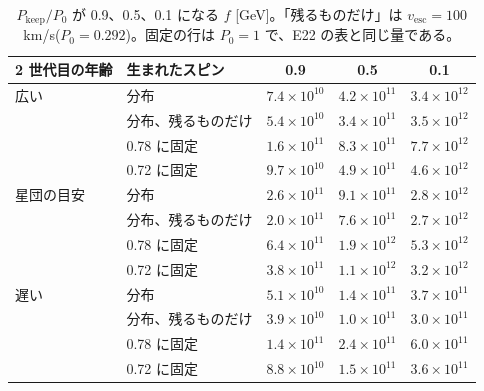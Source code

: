 \begin{table}[H]
\centering\small
\begin{tabular}{llccc}
\toprule
2 世代目の年齢 & 生まれたスピン & 0.9 & 0.5 & 0.1\\
\midrule
広い & 分布 & $7.4\times10^{10}$ & $4.2\times10^{11}$ & $3.4\times10^{12}$\\
 & 分布、残るものだけ & $5.4\times10^{10}$ & $3.4\times10^{11}$ & $3.5\times10^{12}$\\
 & 0.78 に固定 & $1.6\times10^{11}$ & $8.3\times10^{11}$ & $7.7\times10^{12}$\\
 & 0.72 に固定 & $9.7\times10^{10}$ & $4.9\times10^{11}$ & $4.6\times10^{12}$\\
\midrule
星団の目安 & 分布 & $2.6\times10^{11}$ & $9.1\times10^{11}$ & $2.8\times10^{12}$\\
 & 分布、残るものだけ & $2.0\times10^{11}$ & $7.6\times10^{11}$ & $2.7\times10^{12}$\\
 & 0.78 に固定 & $6.4\times10^{11}$ & $1.9\times10^{12}$ & $5.3\times10^{12}$\\
 & 0.72 に固定 & $3.8\times10^{11}$ & $1.1\times10^{12}$ & $3.2\times10^{12}$\\
\midrule
遅い & 分布 & $5.1\times10^{10}$ & $1.4\times10^{11}$ & $3.7\times10^{11}$\\
 & 分布、残るものだけ & $3.9\times10^{10}$ & $1.0\times10^{11}$ & $3.0\times10^{11}$\\
 & 0.78 に固定 & $1.4\times10^{11}$ & $2.4\times10^{11}$ & $6.0\times10^{11}$\\
 & 0.72 に固定 & $8.8\times10^{10}$ & $1.5\times10^{11}$ & $3.6\times10^{11}$\\
\bottomrule
\end{tabular}
\caption{$P_\mathrm{keep}/P_0$ が 0.9、0.5、0.1 になる $f$ [GeV]。「残るものだけ」は $v_\mathrm{esc}=100$ km/s($P_0=0.292$)。固定の行は $P_0=1$ で、E22 の表と同じ量である。}
\label{tab:e23f}
\end{table}

